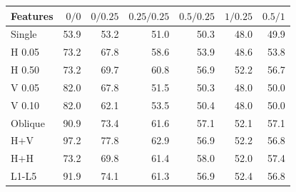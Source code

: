 \begin{tabular}{lrrrrrr}
\toprule
Features & $0/0$ & $0/0.25$ & $0.25/0.25$ & $0.5/0.25$ & $1/0.25$ & $0.5/1$ \\
\midrule
Single & 53.9 & 53.2 & 51.0 & 50.3 & 48.0 & 49.9 \\
H 0.05 & 73.2 & 67.8 & 58.6 & 53.9 & 48.6 & 53.8 \\
H 0.50 & 73.2 & 69.7 & 60.8 & 56.9 & 52.2 & 56.7 \\
V 0.05 & 82.0 & 67.8 & 51.5 & 50.3 & 48.0 & 50.0 \\
V 0.10 & 82.0 & 62.1 & 53.5 & 50.4 & 48.0 & 50.0 \\
Oblique & 90.9 & 73.4 & 61.6 & 57.1 & 52.1 & 57.1 \\
H$+$V & 97.2 & 77.8 & 62.9 & 56.9 & 52.2 & 56.8 \\
H$+$H & 73.2 & 69.8 & 61.4 & 58.0 & 52.0 & 57.4 \\
L1-L5 & 91.9 & 74.1 & 61.3 & 56.9 & 52.4 & 56.8 \\
\bottomrule
\end{tabular}